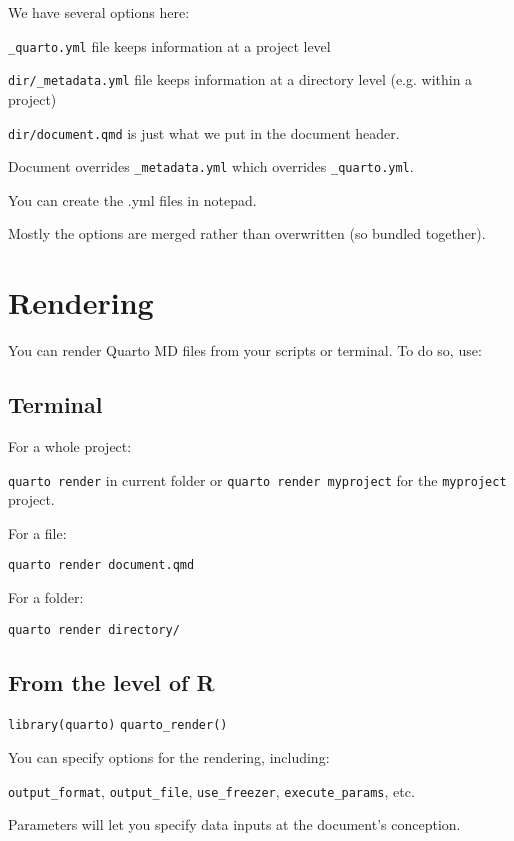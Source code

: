 \documentclass[
  letterpaper,
  DIV=11,
  numbers=noendperiod]{scrartcl}
\begin{document}
We have several options here:

\texttt{\_quarto.yml} file keeps information at a project level

\texttt{dir/\_metadata.yml} file keeps information at a directory level
(e.g. within a project)

\texttt{dir/document.qmd} is just what we put in the document header.

Document overrides \texttt{\_metadata.yml} which overrides
\texttt{\_quarto.yml}.

You can create the .yml files in notepad.

Mostly the options are merged rather than overwritten (so bundled
together).

\hypertarget{rendering}{%
\section{Rendering}\label{rendering}}

You can render Quarto MD files from your scripts or terminal. To do so,
use:

\hypertarget{terminal}{%
\subsection{Terminal}\label{terminal}}

For a whole project:

\texttt{quarto\ render} in current folder or
\texttt{quarto\ render\ myproject} for the \texttt{myproject} project.

For a file:

\texttt{quarto\ render\ document.qmd}

For a folder:

\texttt{quarto\ render\ directory/}

\hypertarget{from-the-level-of-r}{%
\subsection{From the level of R}\label{from-the-level-of-r}}

\texttt{library(quarto)} \texttt{quarto\_render()}

You can specify options for the rendering, including:

\texttt{output\_format}, \texttt{output\_file}, \texttt{use\_freezer},
\texttt{execute\_params}, etc.

Parameters will let you specify data inputs at the document's
conception.
\end{document}

